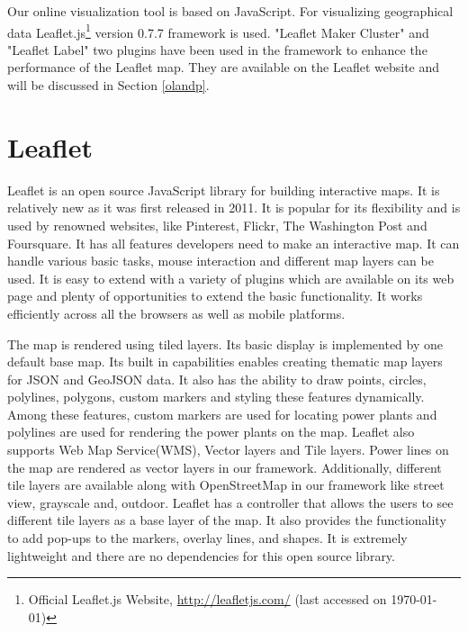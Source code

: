 Our online visualization tool is based on JavaScript. For visualizing geographical data Leaflet.js\footnote{Official Leaflet.js Website, \url{http://leafletjs.com/} (last accessed on \today)} version 0.7.7 framework is used. "Leaflet Maker Cluster" and "Leaflet Label" two plugins have been used in the framework to enhance the performance of the Leaflet map. They are available on the Leaflet website and will be discussed in Section \ref{olandp}.


\section{Leaflet}

Leaflet is an open source JavaScript library for building interactive maps. It is relatively new as it was first released in 2011. It is popular for its flexibility and is used by renowned websites, like Pinterest, Flickr, The Washington Post and Foursquare. It has all features developers need to make an interactive map. It can handle various basic tasks, mouse interaction and different map layers can be used. It is easy to extend with a variety of plugins which are available on its web page and plenty of opportunities to extend the basic functionality. It works efficiently across all the browsers as well as mobile platforms.

The map is rendered using tiled layers. Its basic display is implemented by one default base map. Its built in capabilities enables creating thematic map layers for JSON and GeoJSON data. It also has the ability to draw points, circles, polylines, polygons, custom markers and styling these features dynamically. Among these features, custom markers are used for locating power plants and polylines are used for rendering the power plants on the map. Leaflet also supports Web Map Service(WMS), Vector layers and Tile layers. Power lines on the map are rendered as vector layers in our framework. Additionally, different tile layers are available along with OpenStreetMap in our framework like street view, grayscale and, outdoor. Leaflet has a controller that allows the users to see different tile layers as a base layer of the map. It also provides the functionality to add pop-ups to the markers, overlay lines, and shapes. It is extremely lightweight and there are no dependencies for this open source library. 


